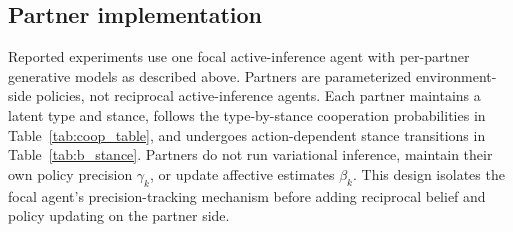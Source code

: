 \subsection{Partner implementation}

Reported experiments use one focal active-inference agent with per-partner generative models as described above. Partners are parameterized environment-side policies, not reciprocal active-inference agents. Each partner maintains a latent type and stance, follows the type-by-stance cooperation probabilities in Table~\ref{tab:coop_table}, and undergoes action-dependent stance transitions in Table~\ref{tab:b_stance}. Partners do not run variational inference, maintain their own policy precision $\gamma_k$, or update affective estimates $\beta_k$. This design isolates the focal agent's precision-tracking mechanism before adding reciprocal belief and policy updating on the partner side.
